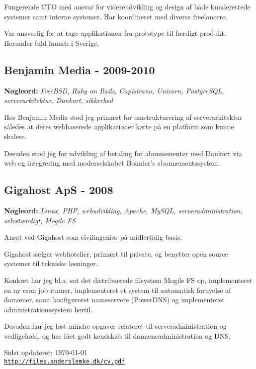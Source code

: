 \documentclass[a4paper]{article}
\newcommand{\keywords}[1]{\small\textbf{Nøgleord:} \emph{#1}\normalsize}
\begin{document}
Fungerende CTO med ansvar for videreudvikling og design af både kunderettede systemer samt interne systemer. Har koordineret med diverse freelancere.

Var ansvarlig for at tage applikationen fra prototype til færdigt produkt. Herunder fuld launch i Sverige. 

\subsection*{Benjamin Media - 2009-2010}

\keywords{FreeBSD, Ruby on Rails, Capistrano, Unicorn, PostgreSQL, serverarkitektur, Dankort, sikkerhed}

Hos Benjamin Media stod jeg primært for omstrukturering af serverarkitektur således at deres webbaserede applikationer kørte på en platform som kunne skalere.

Desuden stod jeg for udvikling af betaling for abonnementer med Dankort via web og integrering med moderselskabet Bonnier's abonnementssystem.

\subsection*{Gigahost ApS - 2008}

\keywords{Linux, PHP, webudvikling, Apache, MySQL, serveradministration, selvstændigt, Mogile FS}

Ansat ved Gigahost som civilingeniør på midlertidig basis.

Gigahost sælger webhoteller, primært til private, og benytter open source systemer til tekniske løsninger.

Konkret har jeg bl.a. sat det distribuerede filsystem Mogile FS op, implementeret en ny cron job runner, implementeret et system til automatisk fornyelse af domæner, samt konfigureret nameservere (PowerDNS) og implementeret administrationssystem hertil.

Desuden har jeg løst mindre opgaver relateret til serveradministration og vedligehold, og har fået godt kendskab til domæneadministration og DNS.
\bigskip
\begin{center}
\begin{footnotesize}
Sidst opdateret: \today \\
\href{http://files.anderslemke.dk/cv.pdf}{\tt http://files.anderslemke.dk/cv.pdf}
\end{footnotesize}
\end{center}
\end{document}
